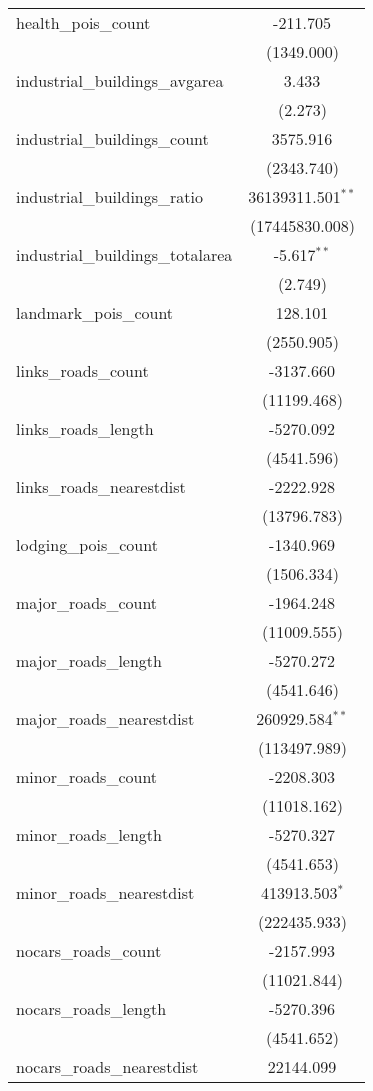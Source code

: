 \begin{table}[!htbp]
\begin{tabular}{@{\extracolsep{5pt}}lc}
 health_pois_count & -211.705$^{}$ \\
  & (1349.000) \\
 industrial_buildings_avgarea & 3.433$^{}$ \\
  & (2.273) \\
 industrial_buildings_count & 3575.916$^{}$ \\
  & (2343.740) \\
 industrial_buildings_ratio & 36139311.501$^{**}$ \\
  & (17445830.008) \\
 industrial_buildings_totalarea & -5.617$^{**}$ \\
  & (2.749) \\
 landmark_pois_count & 128.101$^{}$ \\
  & (2550.905) \\
 links_roads_count & -3137.660$^{}$ \\
  & (11199.468) \\
 links_roads_length & -5270.092$^{}$ \\
  & (4541.596) \\
 links_roads_nearestdist & -2222.928$^{}$ \\
  & (13796.783) \\
 lodging_pois_count & -1340.969$^{}$ \\
  & (1506.334) \\
 major_roads_count & -1964.248$^{}$ \\
  & (11009.555) \\
 major_roads_length & -5270.272$^{}$ \\
  & (4541.646) \\
 major_roads_nearestdist & 260929.584$^{**}$ \\
  & (113497.989) \\
 minor_roads_count & -2208.303$^{}$ \\
  & (11018.162) \\
 minor_roads_length & -5270.327$^{}$ \\
  & (4541.653) \\
 minor_roads_nearestdist & 413913.503$^{*}$ \\
  & (222435.933) \\
 nocars_roads_count & -2157.993$^{}$ \\
  & (11021.844) \\
 nocars_roads_length & -5270.396$^{}$ \\
  & (4541.652) \\
 nocars_roads_nearestdist & 22144.099$^{}$ \\

\end{tabular}
\end{table}
